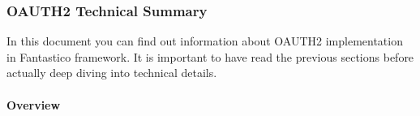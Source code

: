 \documentclass[letterpaper,10pt,english]{sphinxmanual}
\begin{document}
\subsubsection{OAUTH2 Technical Summary}
\label{features/oauth2/technical_summary:oauth2-technical-summary}\label{features/oauth2/technical_summary::doc}
In this document you can find out information about OAUTH2 implementation in Fantastico framework. It is important to have read
the previous sections before actually deep diving into technical details.


\paragraph{Overview}
\label{features/oauth2/technical_summary:overview}
\end{document}
